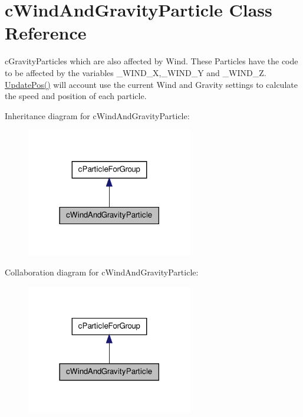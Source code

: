 \hypertarget{classc_wind_and_gravity_particle}{
\section{cWindAndGravityParticle Class Reference}
\label{classc_wind_and_gravity_particle}
}


cGravityParticles which are also affected by Wind. These Particles have the code to be affected by the variables \_\-WIND\_\-X,\_\-WIND\_\-Y and \_\-WIND\_\-Z. \hyperlink{classc_wind_and_gravity_particle_a3a4f069daf2a06fbf3b429fe55bfdcae}{UpdatePos()} will account use the current Wind and Gravity settings to calculate the speed and position of each particle.  




Inheritance diagram for cWindAndGravityParticle:
\nopagebreak
\begin{figure}[H]
\begin{center}
\leavevmode
\includegraphics[width=206pt]{classc_wind_and_gravity_particle__inherit__graph}
\end{center}
\end{figure}


Collaboration diagram for cWindAndGravityParticle:
\nopagebreak
\begin{figure}[H]
\begin{center}
\leavevmode
\includegraphics[width=206pt]{classc_wind_and_gravity_particle__coll__graph}
\end{center}
\end{figure}
